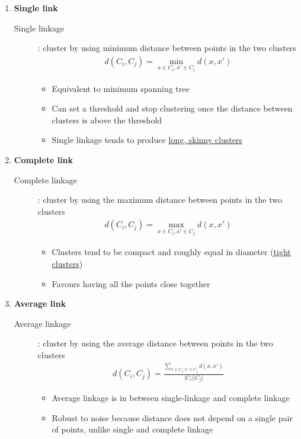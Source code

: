 \documentclass[letterpaper,12pt]{article}
\newcommand{\abs}[1]{\lvert#1\rvert}
\begin{document}
\begin{enumerate}
 \item \textbf{Single link}
       \begin{description}
        \item[Single linkage]: cluster by using minimum distance between points in the two clusters
              \begin{align}
               d(C_i,C_j)= \min_{x\in C_i, x' \in C_j} d(x,x')
              \end{align}
              \begin{itemize}
               \item Equivalent to minimum spanning tree
               \item Can set a threshold and stop clustering once the distance between clusters is above the threshold
               \item Single linkage tends to produce \underline{long, skinny clusters}
              \end{itemize}
       \end{description}
 \item \textbf{Complete link}
       \begin{description}
        \item[Complete linkage]: cluster by using the maximum distance between points in the two clusters
              \begin{align}
               d(C_i, C_j) = \max_{x\in C_i, x' \in C_j} d(x,x')
              \end{align}
              \begin{itemize}
               \item Clusters tend to be compact and roughly equal in diameter (\underline{tight clusters})
               \item Favours having all the points close together
              \end{itemize}
       \end{description}
 \item \textbf{Average link}
       \begin{description}
        \item[Average linkage]: cluster by using the average distance between points in the two clusters
              \begin{align}
               d(C_i, C_j) = \frac{\sum_{x\in C_i, x' \in C_j} d(x,x')}{\abs{C_i}\abs{C_j}}
              \end{align}
              \begin{itemize}
               \item Average linkage is in between single-linkage and complete linkage
               \item Robust to noise because distance does not depend on a single pair of points, unlike single and complete linkage
              \end{itemize}
       \end{description}
\end{enumerate}
\end{document}
